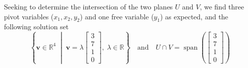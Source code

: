 \documentclass[11pt]{article}
\newcommand{\R}{\mathbb{R}}
\DeclareMathOperator{\Span}{span}
\theoremstyle{definition}
\theoremstyle{plain}
\theoremstyle{remark}
\begin{document}
\begin{enumerate}
          Seeking to determine the intersection of the two planes \(U\) and \(V\), we find three pivot variables (\(x_1,
          x_2, y_2\)) and one free variable (\(y_1\)) as expected, and the following solution set
          \[
              \left \{
              \mathbf{v} \in \R^4 \;\middle |\; \mathbf{v} = \lambda
              \begin{bmatrix}
                  3 \\ 7 \\ 1 \\ 0
              \end{bmatrix}
              ,\;
              \lambda \in \R
              \right \}
              \quad
              \text{and}
              \quad
              U \cap V =
              \Span \left (
              \begin{bmatrix}
                      3 \\ 7 \\ 1 \\ 0
                  \end{bmatrix}
              \right )
          \]


\end{enumerate}
\end{document}
